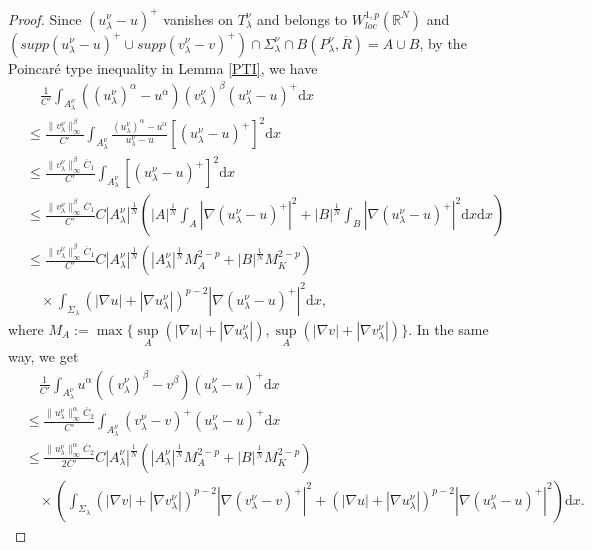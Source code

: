 \documentclass[12pt]{amsart}
\theoremstyle{definition}
\theoremstyle{remark}
\theoremstyle{conclusion}
\theoremstyle{conjecture}
\numberwithin{equation}{section}
\newcommand{\R}{\mathbb{R}}
\begin{document}
\begin{proof}
Since $(u^{\nu}_{\lambda}-u )^+$ vanishes on $T_\lambda^\nu$ and belongs to $W^{1,p}_{loc}(\R^N)$ and $(supp(u^{\nu}_{\lambda}-u)^+\cup supp(v^{\nu}_{\lambda}-v)^+) \cap\Sigma^{\nu}_{\lambda}\cap B(P_\lambda^\nu,\overline{R})=A \cup B$, by the Poincar\'{e} type inequality in Lemma \ref{PTI}, we have
\begin{align}\label{eq1203}
&\quad \frac{1}{C'}\int_{A^\nu_\lambda}((u^\nu_{\lambda})^\alpha-u^\alpha) (v^\nu_{\lambda})^\beta (u^\nu_{\lambda}-u)^+ \mathrm{d}x \\
&\leq \frac{\|v^\nu_\lambda\|^\beta_\infty }{C'} \int_{A_\lambda^\nu} \frac{(u^\nu_{\lambda})^\alpha-u^\alpha}{u^{\nu}_{\lambda}-u}[(u^{\nu}_{\lambda}-u )^+]^2 \mathrm{d}x \nonumber\\
&\leq \frac{\|v^\nu_\lambda\|^\beta_\infty\overline{C}_1}{C'} \int_{A_\lambda^\nu}[(u^{\nu}_{\lambda}-u )^+]^2 \mathrm{d}x \nonumber\\
&\leq \frac{\|v^\nu_\lambda\|^\beta_\infty \overline{C}_1}{C'} C |A_\lambda^\nu|^\frac{1}{N} \left( |A|^\frac{1}{N} \int_{A} |\nabla(u^{\nu}_{\lambda}-u )^+|^2+|B|^\frac{1}{N} \int_{B} |\nabla(u^{\nu}_{\lambda}-u )^+|^2 \mathrm{d}x \mathrm{d}x \right)\nonumber\\
&\leq \frac{\|v^\nu_\lambda\|^\beta_\infty \overline{C}_1}{C'}C |A_\lambda^\nu|^\frac{1}{N} \left(|A_\lambda^\nu|^\frac{1}{N} M_A^{2-p}+|B|^\frac{1}{N} M_K^{2-p} \right)  \nonumber\\
&\quad \times \int_{\Sigma_\lambda} (|\nabla u|+|\nabla u^{\nu}_{\lambda}|)^{p-2} |\nabla(u^{\nu}_{\lambda}-u )^+|^2 \mathrm{d}x, \nonumber
\end{align}
where $M_A:=\max\{ \sup\limits_A (|\nabla u|+|\nabla u^{\nu}_{\lambda}|), \sup\limits_A (|\nabla v|+|\nabla v^{\nu}_{\lambda}|)\}$. In the same way, we get
\begin{align}\label{eq1203-}
    &\quad \frac{1}{C'}\int_{A^\nu_\lambda}u^\alpha((v^\nu_{\lambda})^\beta -v^{\beta}) (u^\nu_{\lambda}-u)^+ \mathrm{d}x \\
    &\leq \frac{\|u^\nu_\lambda\|^\alpha_\infty\overline{C}_2}{C'} \int_{A_\lambda^\nu}(v^{\nu}_{\lambda}-v )^+(u^{\nu}_{\lambda}-u )^+ \mathrm{d}x \nonumber\\
    &\leq \frac{\|u^\nu_\lambda\|^\alpha_\infty \overline{C}_2}{2C'}C |A_\lambda^\nu|^\frac{1}{N} \left(|A_\lambda^\nu|^\frac{1}{N} M_A^{2-p}+ |B|^\frac{1}{N} M_K^{2-p} \right)  \nonumber\\
&\quad \times \left(\int_{\Sigma_\lambda} (|\nabla v|+|\nabla v^{\nu}_{\lambda}|)^{p-2} |\nabla(v^{\nu}_{\lambda}-v )^+|^2 +(|\nabla u|+|\nabla u^{\nu}_{\lambda}|)^{p-2} |\nabla(u^{\nu}_{\lambda}-u )^+|^2\right)\mathrm{d}x. \nonumber
\end{align}


\end{proof}
\end{document}
